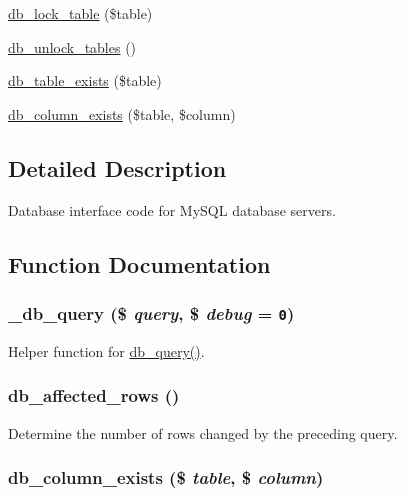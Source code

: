 \begin{Indent}{\bf }
\begin{CompactItemize}
\item 
\hyperlink{database_8mysql_8inc_8584042b05393a82b7d06c2ee6cf95ed}{db\_\-lock\_\-table} (\$table)
\item 
\hyperlink{database_8mysql_8inc_827df02252c1d606c685b768807b7181}{db\_\-unlock\_\-tables} ()
\item 
\hyperlink{database_8mysql_8inc_78809300cee80db034832825aed55b70}{db\_\-table\_\-exists} (\$table)
\item 
\hyperlink{database_8mysql_8inc_3d649bb8d8b9a7222c0bded9d7e2785a}{db\_\-column\_\-exists} (\$table, \$column)
\end{CompactItemize}
\end{Indent}


\subsection{Detailed Description}
Database interface code for MySQL database servers. 

\subsection{Function Documentation}
\hypertarget{database_8mysql_8inc_f0a663e6a6aaf095f78a77c871b8028b}{
\subsubsection[{\_\-db\_\-query}]{\setlength{\rightskip}{0pt plus 5cm}\_\-db\_\-query (\$ {\em query}, \/  \$ {\em debug} = {\tt 0})}}
\label{database_8mysql_8inc_f0a663e6a6aaf095f78a77c871b8028b}


Helper function for \hyperlink{database_8mysql-common_8inc_9e096321b86945d128746ac7bedce8f3}{db\_\-query()}. \hypertarget{database_8mysql_8inc_e3bc677fbeebd688068ce3b413ac2944}{
\subsubsection[{db\_\-affected\_\-rows}]{\setlength{\rightskip}{0pt plus 5cm}db\_\-affected\_\-rows ()}}
\label{database_8mysql_8inc_e3bc677fbeebd688068ce3b413ac2944}


Determine the number of rows changed by the preceding query. \hypertarget{database_8mysql_8inc_3d649bb8d8b9a7222c0bded9d7e2785a}{
\subsubsection[{db\_\-column\_\-exists}]{\setlength{\rightskip}{0pt plus 5cm}db\_\-column\_\-exists (\$ {\em table}, \/  \$ {\em column})}}
\label{database_8mysql_8inc_3d649bb8d8b9a7222c0bded9d7e2785a}


